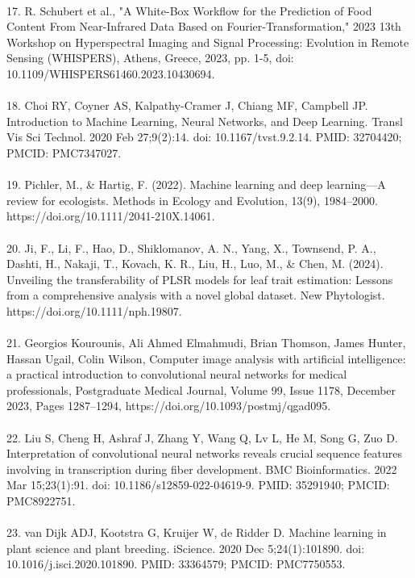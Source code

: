 \documentclass[12pt,a4paper]{report}
\begin{document}
\\
17. R. Schubert et al., "A White-Box Workflow for the Prediction of Food Content From Near-Infrared Data Based on Fourier-Transformation," 2023 13th Workshop on Hyperspectral Imaging and Signal Processing: Evolution in Remote Sensing (WHISPERS), Athens, Greece, 2023, pp. 1-5, doi: 10.1109/WHISPERS61460.2023.10430694. \\
\\
18. Choi RY, Coyner AS, Kalpathy-Cramer J, Chiang MF, Campbell JP. Introduction to Machine Learning, Neural Networks, and Deep Learning. Transl Vis Sci Technol. 2020 Feb 27;9(2):14. doi: 10.1167/tvst.9.2.14. PMID: 32704420; PMCID: PMC7347027.\\
\\
19. Pichler, M., \& Hartig, F. (2022). Machine learning and deep learning—A review for ecologists. Methods in Ecology and Evolution, 13(9), 1984–2000. https://doi.org/10.1111/2041-210X.14061. \\
\\
20. Ji, F., Li, F., Hao, D., Shiklomanov, A. N., Yang, X., Townsend, P. A., Dashti, H., Nakaji, T., Kovach, K. R., Liu, H., Luo, M., \& Chen, M. (2024). Unveiling the transferability of PLSR models for leaf trait estimation: Lessons from a comprehensive analysis with a novel global dataset. New Phytologist. https://doi.org/10.1111/nph.19807. \\
\\
21. Georgios Kourounis, Ali Ahmed Elmahmudi, Brian Thomson, James Hunter, Hassan Ugail, Colin Wilson, Computer image analysis with artificial intelligence: a practical introduction to convolutional neural networks for medical professionals, Postgraduate Medical Journal, Volume 99, Issue 1178, December 2023, Pages 1287–1294, https://doi.org/10.1093/postmj/qgad095. \\
\\
22. Liu S, Cheng H, Ashraf J, Zhang Y, Wang Q, Lv L, He M, Song G, Zuo D. Interpretation of convolutional neural networks reveals crucial sequence features involving in transcription during fiber development. BMC Bioinformatics. 2022 Mar 15;23(1):91. doi: 10.1186/s12859-022-04619-9. PMID: 35291940; PMCID: PMC8922751. \\
\\
23. van Dijk ADJ, Kootstra G, Kruijer W, de Ridder D. Machine learning in plant science and plant breeding. iScience. 2020 Dec 5;24(1):101890. doi: 10.1016/j.isci.2020.101890. PMID: 33364579; PMCID: PMC7750553. \\
\\
\end{document}
